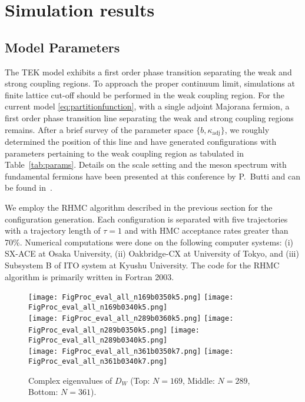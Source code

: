 \documentclass[a4paper,11pt]{article}
\begin{document}
\section{Simulation results}
\label{sec:2}
\subsection{Model Parameters}  
The TEK model exhibits a first order phase transition separating the weak and strong coupling regions.
To approach the proper continuum limit, simulations at finite lattice cut-off should be performed in the weak coupling region.
For the current model \eqref{eq:partitionfunction}, with a single adjoint Majorana fermion,
a first order phase transition line separating the weak and strong coupling regions remains.
After a brief survey of the parameter space $\{b,\kappa_{\mathrm{adj}}\}$, we roughly determined the position of this line
and have generated configurations with parameters pertaining to the weak coupling region as tabulated in Table~\ref{tab:params}.
Details on the scale setting and the meson spectrum with fundamental fermions
have been presented at this conference by P.~Butti and can be found in~\cite{Pietro}.

We employ the RHMC algorithm described in the previous section for the configuration generation.
Each configuration is separated with five trajectories with a trajectory length of $\tau=1$
and with HMC acceptance rates greater than 70\%.
Numerical computations were done on the following computer systems:
(i) SX-ACE at Osaka University,
(ii) Oakbridge-CX at University of Tokyo, and
(iii) Subsystem B of ITO system at Kyushu University.
The code for the RHMC algorithm is primarily written in Fortran 2003.

\begin{figure}[t]
    \centering
    \texttt{[image: FigProc\_eval\_all\_n169b0350k5.png]}
    \texttt{[image: FigProc\_eval\_all\_n169b0340k5.png]}\\
    \texttt{[image: FigProc\_eval\_all\_n289b0360k5.png]}
    \texttt{[image: FigProc\_eval\_all\_n289b0350k5.png]}
    \texttt{[image: FigProc\_eval\_all\_n289b0340k5.png]}\\
    \texttt{[image: FigProc\_eval\_all\_n361b0350k7.png]}
    \texttt{[image: FigProc\_eval\_all\_n361b0340k7.png]}
    \caption{Complex eigenvalues of $D_W$ (Top: $N=169$, Middle: $N=289$, Bottom: $N=361$).}
    \label{fig:complexeigen}
\end{figure}
\end{document}
